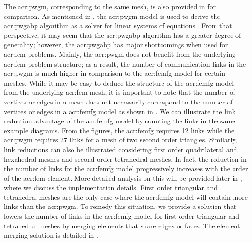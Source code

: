 The \gls{acr:pwgm}, corresponding to the same mesh, is also provided in  for comparison.
As mentioned in , the \gls{acr:pwgm} model is used to derive the \gls{acr:pwgabp} algorithm as a solver for linear systems of equations \cite{bib:Shental2008GBPSSLE}.
From that perspective, it may seem that the \gls{acr:pwgabp} algorithm has a greater degree of generality; however, the \gls{acr:pwgabp} has major shortcomings when used for \gls{acr:fem} problems.
Mainly, the \gls{acr:pwgm} does not benefit from the underlying \gls{acr:fem} problem structure; as a result, the number of communication links in the \gls{acr:pwgm} is much higher in comparison to the \gls{acr:femfg} model for certain meshes.
While it may be easy to deduce the structure of the \gls{acr:femfg} model from the underlying \gls{acr:fem} mesh, it is important to note that the number of vertices or edges in a mesh does not necessarily correspond to the number of vertices or edges in a \gls{acr:femfg} model as shown in .
We can illustrate the link reduction advantage of the \gls{acr:femfg} model by counting the links in the same example diagrams.
From the figures, the \gls{acr:femfg} requires 12 links while the \gls{acr:pwgm} requires 27 links for a mesh of two second order triangles.
Similarly, link reductions can also be illustrated considering first order quadrilateral and hexahedral meshes and second order tetrahedral meshes.
In fact, the reduction in the number of links for the \gls{acr:femfg} model progressively increases with the order of the \gls{acr:fem} element.
More detailed analysis on this will be provided later in , where we discuss the implementation details.
First order triangular and tetrahedral meshes are the only case where the \gls{acr:femfg} model will contain more links than the \gls{acr:pwgm}.
To remedy this situation, we provide a solution that lowers the number of links in the \gls{acr:femfg} model for first order triangular and tetrahedral meshes by merging elements that share edges or faces.
The element merging solution is detailed in .

